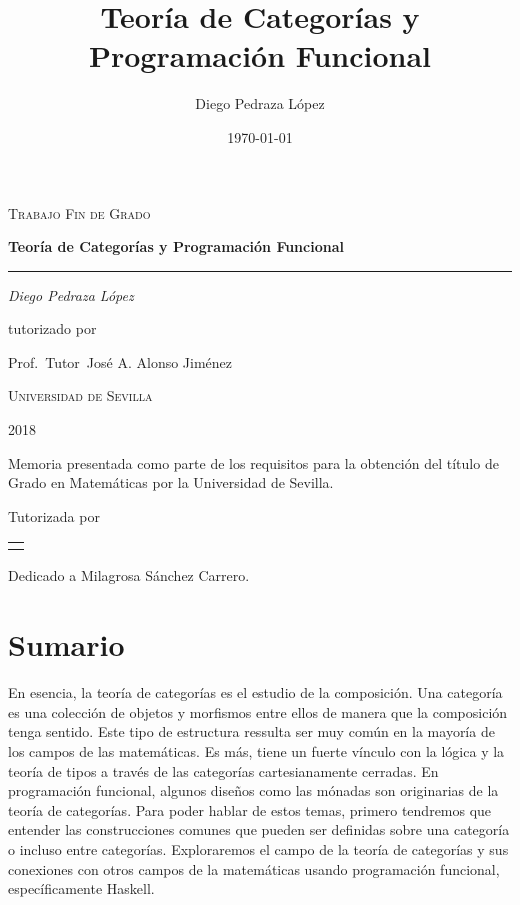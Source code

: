 \documentclass[12pt, twoside]{book}
\title{Teoría de Categorías y Programación Funcional}
\author{Diego Pedraza López}
\date{\today}
\makeatletter
\newenvironment{dedication}
  {\clearpage           %
   \thispagestyle{empty}%
   \vspace*{\stretch{1}}%
   \itshape             %
   \raggedleft          %
  }
  {\par %
   \vspace{\stretch{3}} %
   \clearpage           %
  }
\renewcommand\maketitle{%
  \begin{titlepage}
  \parindent=0pt
  \begin{flushleft}
  \vspace*{1.5mm}
  \setlength\baselineskip{0pt}
  \setlength\parskip{0mm}
  \begin{center}
  \end{center}
  \end{flushleft}
  \vspace{1cm}
  \bgroup
  \Large \bfseries
  \begin{center}
  \@title
  \end{center}
  \egroup
  \vspace*{.5cm}
  \begin{center}
  \@author
  \end{center}
  \begin{center}
  2018
  \end{center}
  \vspace*{1.8cm}
  \begin{flushright}
  \begin{minipage}{8.45cm}
      Memoria presentada como parte de los requisitos para la obtención del título de
      Grado en Matemáticas por la Universidad de Sevilla.

      \vspace*{7.5mm}

      Tutorizada por
  \end{minipage}\par
  \begin{tabularx}{8.45cm}[b]{@{}l}
      \guardatutores
  \end{tabularx}
   \end{flushright}
      \vspace*{\fill}
   \end{titlepage}
   \pagestyle{tfg}
   \renewcommand{\chaptermark}[1]{\markright{\thechapter.\space ##1}}
   \renewcommand{\sectionmark}[1]{}
   \renewcommand{\subsectionmark}[1]{}
  }
\makeatother
\begin{document}
\begin{titlepage}
  \centering
  {\scshape\Large Trabajo Fin de Grado\par}
  \vspace{1.5cm}
  {\huge\bfseries Teoría de Categorías y Programación Funcional\par}
  \vspace{0.025cm}
  \rule{0.4\textwidth}{0.4pt}
  \vspace{1cm}

  {\Large\itshape Diego Pedraza López\par}
  \vspace{1cm}
  tutorizado por\par
  Prof.~Tutor~José A. Alonso Jiménez\par
  \vspace{1cm}
  \vspace{7cm}

  {\scshape\LARGE Universidad de Sevilla \par}
  \vfill
\end{titlepage}

\maketitle

\begin{dedication}
Dedicado a Milagrosa Sánchez Carrero.  
\end{dedication}
\frontmatter

\tableofcontents

\mainmatter

\chapter*{Sumario}
En esencia, la teoría de categorías es el estudio de la composición.
Una categoría es una colección de objetos y morfismos entre ellos de manera que la composición tenga sentido.
Este tipo de estructura ressulta ser muy común en la mayoría de los campos de las matemáticas.
Es más, tiene un fuerte vínculo con la lógica y la teoría de tipos a través de las categorías cartesianamente cerradas.
En programación funcional, algunos diseños como las mónadas son originarias de la teoría de categorías.
Para poder hablar de estos temas, primero tendremos que entender las construcciones comunes que pueden ser definidas sobre una categoría o incluso entre categorías.
Exploraremos el campo de la teoría de categorías y sus conexiones con otros campos de la matemáticas usando programación funcional, específicamente Haskell.
\end{document}
